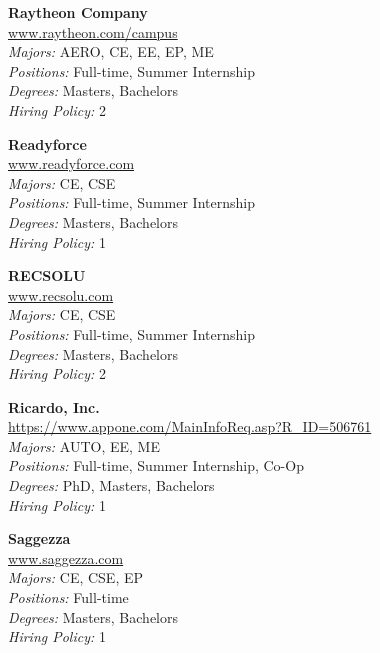 \documentclass[twoside]{article}
\begin{document}
\begin{center}
\begin{multicols}{3}
\begin{minipage}{.9\columnwidth}{\Large\bf Raytheon Company }\\
	\url{www.raytheon.com/campus}\\
	\emph{Majors:} AERO, CE, EE, EP, ME\\
	\emph{Positions:} Full-time, Summer Internship\\
	\emph{Degrees:} Masters, Bachelors\\
	\emph{Hiring Policy:} 2\\
\end{minipage}
 
\begin{minipage}{.9\columnwidth}{\Large\bf Readyforce }\\
	\url{www.readyforce.com}\\
	\emph{Majors:} CE, CSE\\
	\emph{Positions:} Full-time, Summer Internship\\
	\emph{Degrees:} Masters, Bachelors\\
	\emph{Hiring Policy:} 1\\
\end{minipage}
 
\begin{minipage}{.9\columnwidth}{\Large\bf RECSOLU }\\
	\url{www.recsolu.com}\\
	\emph{Majors:} CE, CSE\\
	\emph{Positions:} Full-time, Summer Internship\\
	\emph{Degrees:} Masters, Bachelors\\
	\emph{Hiring Policy:} 2\\
\end{minipage}
 
\begin{minipage}{.9\columnwidth}{\Large\bf Ricardo, Inc. }\\
	\url{https://www.appone.com/MainInfoReq.asp?R_ID=506761}\\
	\emph{Majors:} AUTO, EE, ME\\
	\emph{Positions:} Full-time, Summer Internship, Co-Op\\
	\emph{Degrees:} PhD, Masters, Bachelors\\
	\emph{Hiring Policy:} 1\\
\end{minipage}
 
\begin{minipage}{.9\columnwidth}{\Large\bf Saggezza }\\
	\url{www.saggezza.com}\\
	\emph{Majors:} CE, CSE, EP\\
	\emph{Positions:} Full-time\\
	\emph{Degrees:} Masters, Bachelors\\
	\emph{Hiring Policy:} 1\\
\end{minipage}
 

\end{multicols}
\end{center}
\end{document}
